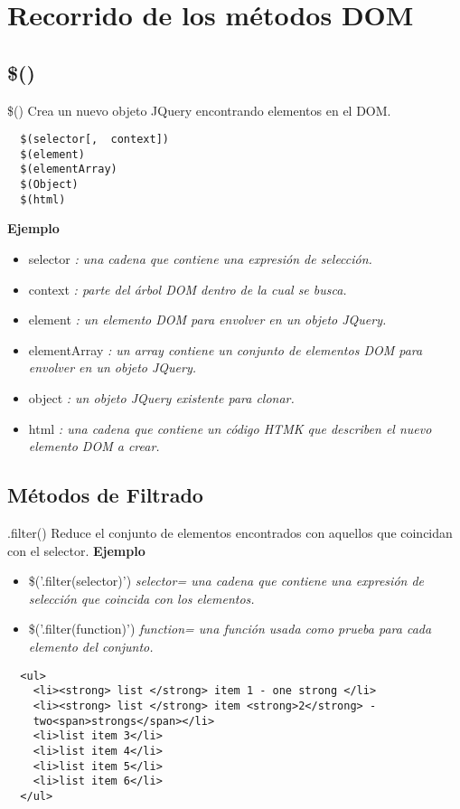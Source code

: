 \section{Recorrido de los métodos DOM}

\subsection{\$()} %

\begin{frame}[fragile]{\$()} %
Crea un nuevo objeto JQuery encontrando elementos en el DOM.
\begin{lstlisting}
  $(selector[,  context])
  $(element)
  $(elementArray)
  $(Object)
  $(html)
\end{lstlisting}
\textbf{Ejemplo}
\begin{itemize}
    \item selector \textit{: una cadena que contiene una expresión de selección.}
    \item context \textit{: parte del árbol DOM dentro de la cual se busca.}
    \item element \textit{: un elemento DOM para envolver en un objeto JQuery.}
    \item elementArray \textit{: un array contiene un conjunto de elementos DOM
    para envolver en un objeto JQuery.}
    \item object \textit{: un objeto JQuery existente para clonar.}
    \item html \textit{: una cadena que contiene un código HTMK que describen
    el nuevo elemento DOM a crear.}
\end{itemize}
\end{frame}

\subsection{Métodos de Filtrado} %

\begin{frame}[fragile]{.filter()} %
Reduce el conjunto de elementos encontrados con aquellos que coincidan con el
selector.
\textbf{Ejemplo}
\begin{itemize}
    \item \$('.filter(selector)') \textit{ selector= una cadena que contiene
    una expresión de selección que coincida con los elementos.}
    \item \$('.filter(function)') \textit{ function= una función usada como
    prueba para cada elemento del conjunto.}
\end{itemize}
\begin{lstlisting}
  <ul>
    <li><strong> list </strong> item 1 - one strong </li>
    <li><strong> list </strong> item <strong>2</strong> -
    two<span>strongs</span></li>
    <li>list item 3</li>
    <li>list item 4</li>
    <li>list item 5</li>
    <li>list item 6</li>
  </ul>    
\end{lstlisting}
\end{frame}

